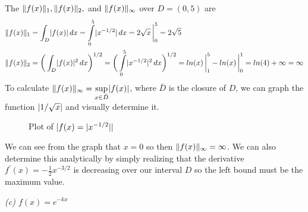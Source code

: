 \documentclass[12pt]{article}
\DeclarePairedDelimiter \abs{\lvert}{\rvert}%
\DeclarePairedDelimiter \norm{\lVert}{\rVert}%
\theoremstyle{remark}
\begin{document}
The $\norm{f(x)}_1, \norm{f(x)}_2,$ and $\norm{f(x)}_\infty$ over $D = (0,5)$ are
\begin{align*}
	\norm{f(x)}_1 & = \int_D \abs{f(x)} \, dx = \int\limits_0^5 \abs{x^{-1/2}} \, dx = 2\sqrt{x} \, \bigg\vert_0^5 = 2\sqrt{5} \\
	\norm{f(x)}_2 & = \bigg(\int_D \abs{f(x)}^2 \, dx\bigg)^{1/2} = \bigg(\int\limits_0^5 \abs{x^{-1/2}}^2 \, dx\bigg)^{1/2} = ln(x) \,\bigg\vert_1^5 - ln(x)\,\bigg\vert_0^1 = ln(4) + \infty = \infty
\end{align*}
To calculate $\norm{f(x)}_\infty = \sup\limits_{x \in \bar{D}} \abs{f(x)}$, where $\bar{D}$ is the closure of $D$, we can graph the function $\abs{1/\sqrt{x}}$ and visually determine it. 
\begin{figure}[H]
	\centering
	\caption{Plot of $\abs{f(x) = \abs{x^{-1/2}}}$}
\end{figure}
We can see from the graph that $x = 0$ so then $\norm{f(x)}_\infty = \infty$. We can also determine this analytically by simply realizing that the derivative $f^\prime(x) = -\frac{1}{2}x^{-3/2}$ is decreasing over our interval $D$ so the left bound must be the maximum value. \\

\newpage

\textit{(c) $f(x) = e^{-kx}$} \\ 
\end{document}
